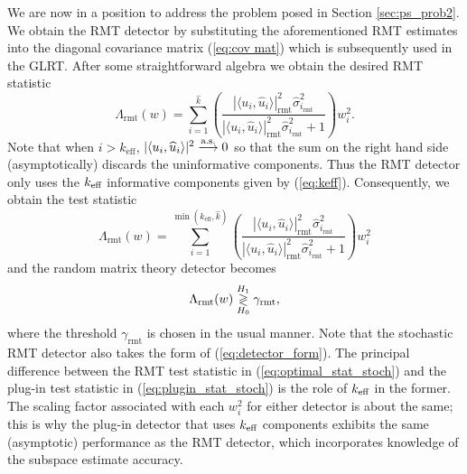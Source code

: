 We are now in a position to address the problem posed in Section \ref{sec:ps_prob2}. We obtain the RMT detector by substituting the aforementioned RMT estimates into the diagonal covariance matrix (\ref{eq:cov mat}) which is subsequently used in the GLRT. After some straightforward algebra we obtain the desired RMT statistic
\begin{equation*}
\Lambda_{\text{rmt}}(w)= \sum_{i=1}^{\widehat{k}}\left(\frac{|\langle u_i,\widehat{u}_i\rangle|^2_{\text{rmt}}\widehat{\sigma}_{i_\text{rmt}}^2}{|\langle u_i,\widehat{u}_i\rangle|^2_{\text{rmt}}\widehat{\sigma}_{i_\text{rmt}}^2 + 1}\right)w_i^2.
\end{equation*}
Note that when $i>k_\text{eff}$, $|\langle u_i,\widehat{u}_i\rangle|^2 \overset{\textrm{a.s.}}{\longrightarrow} 0$ so that the sum on the right hand side (asymptotically) discards the uninformative components. Thus the RMT detector only uses the $k_\text{eff}$ informative components given by (\ref{eq:keff}). Consequently, we obtain the test statistic
\begin{equation}\label{eq:optimal_stat_stoch}
\boxed{\Lambda_{\text{rmt}}(w)= \sum_{i=1}^{\min(k_\text{eff},\widehat{k})}\left(\frac{|\langle u_i,\widehat{u}_i\rangle|^2_{\text{rmt}}\widehat{\sigma}_{i_\text{rmt}}^2}{|\langle u_i,\widehat{u}_i\rangle|^2_{\text{rmt}}\widehat{\sigma}_{i_\text{rmt}}^2 + 1}\right)w_i^2}
\end{equation}
and the random matrix theory detector becomes
\begin{equation}\label{eq:optimal_class_stoch}
{\Lambda_{\text{rmt}}(w) \detgtrless \gamma_{\text{rmt}}},
\end{equation}
where the threshold $\gamma_{\text{rmt}}$ is chosen in the usual manner. Note that the stochastic RMT detector also takes the form of (\ref{eq:detector_form}). The principal difference between the RMT test statistic in (\ref{eq:optimal_stat_stoch}) and the plug-in test statistic in (\ref{eq:plugin_stat_stoch}) is the role of $k_\text{eff}$ in the former. The scaling factor associated with each $w_i^{2}$ for either detector is about the same; this is why the plug-in detector that uses $k_\text{eff}$ components exhibits the same (asymptotic) performance as the RMT detector, which incorporates knowledge of the subspace estimate accuracy.


